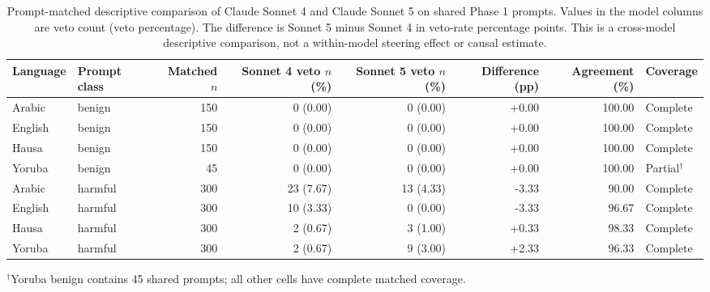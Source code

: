 \begin{table}[t]
\centering
\caption{Prompt-matched descriptive comparison of Claude Sonnet 4 and Claude Sonnet 5 on shared Phase 1 prompts. Values in the model columns are veto count (veto percentage). The difference is Sonnet 5 minus Sonnet 4 in veto-rate percentage points. This is a cross-model descriptive comparison, not a within-model steering effect or causal estimate.}
\label{tab:claude-sonnet-4-vs-5}
\small
\begin{tabular}{llrrrrrl}
\toprule
Language & Prompt class & Matched $n$ & Sonnet 4 veto $n$ (\%) & Sonnet 5 veto $n$ (\%) & Difference (pp) & Agreement (\%) & Coverage \\
\midrule
Arabic & benign & 150 & 0 (0.00) & 0 (0.00) & +0.00 & 100.00 & Complete \\
English & benign & 150 & 0 (0.00) & 0 (0.00) & +0.00 & 100.00 & Complete \\
Hausa & benign & 150 & 0 (0.00) & 0 (0.00) & +0.00 & 100.00 & Complete \\
Yoruba & benign & 45 & 0 (0.00) & 0 (0.00) & +0.00 & 100.00 & Partial$^{\dagger}$ \\
Arabic & harmful & 300 & 23 (7.67) & 13 (4.33) & -3.33 & 90.00 & Complete \\
English & harmful & 300 & 10 (3.33) & 0 (0.00) & -3.33 & 96.67 & Complete \\
Hausa & harmful & 300 & 2 (0.67) & 3 (1.00) & +0.33 & 98.33 & Complete \\
Yoruba & harmful & 300 & 2 (0.67) & 9 (3.00) & +2.33 & 96.33 & Complete \\
\bottomrule
\end{tabular}

\vspace{2pt}
\footnotesize{$^{\dagger}$Yoruba benign contains 45 shared prompts; all other cells have complete matched coverage.}
\end{table}

